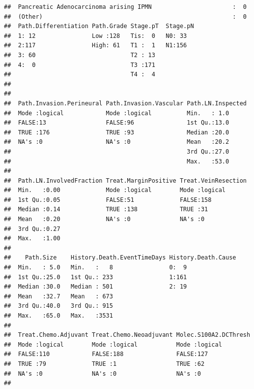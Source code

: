 \documentclass{article}\usepackage[]{graphicx}\usepackage[]{color}
\makeatletter
\newenvironment{kframe}{%
 \def\at@end@of@kframe{}%
 \ifinner\ifhmode%
  \def\at@end@of@kframe{\end{minipage}}%
  \begin{minipage}{\columnwidth}%
 \fi\fi%
 \def\FrameCommand##1{\hskip\@totalleftmargin \hskip-\fboxsep
 \colorbox{shadecolor}{##1}\hskip-\fboxsep
     \hskip-\linewidth \hskip-\@totalleftmargin \hskip\columnwidth}%
 \MakeFramed {\advance\hsize-\width
   \@totalleftmargin\z@ \linewidth\hsize
   \@setminipage}}%
 {\par\unskip\endMakeFramed%
 \at@end@of@kframe}
\newenvironment{knitrout}{}{} %
\makeatother
\begin{document}
\begin{knitrout}
\begin{kframe}
\begin{verbatim}
##  Pancreatic Adenocarcinoma arising IPMN                       :  0  
##  (Other)                                                      :  0  
##  Path.Differentiation Path.Grade Stage.pT  Stage.pN
##  1: 12                Low :128   Tis:  0   N0: 33  
##  2:117                High: 61   T1 :  1   N1:156  
##  3: 60                           T2 : 13           
##  4:  0                           T3 :171           
##                                  T4 :  4           
##                                                    
##                                                    
##  Path.Invasion.Perineural Path.Invasion.Vascular Path.LN.Inspected
##  Mode :logical            Mode :logical          Min.   : 1.0     
##  FALSE:13                 FALSE:96               1st Qu.:13.0     
##  TRUE :176                TRUE :93               Median :20.0     
##  NA's :0                  NA's :0                Mean   :20.2     
##                                                  3rd Qu.:27.0     
##                                                  Max.   :53.0     
##                                                                   
##  Path.LN.InvolvedFraction Treat.MarginPositive Treat.VeinResection
##  Min.   :0.00             Mode :logical        Mode :logical      
##  1st Qu.:0.05             FALSE:51             FALSE:158          
##  Median :0.14             TRUE :138            TRUE :31           
##  Mean   :0.20             NA's :0              NA's :0            
##  3rd Qu.:0.27                                                     
##  Max.   :1.00                                                     
##                                                                   
##    Path.Size    History.Death.EventTimeDays History.Death.Cause
##  Min.   : 5.0   Min.   :   8                0:  9              
##  1st Qu.:25.0   1st Qu.: 233                1:161              
##  Median :30.0   Median : 501                2: 19              
##  Mean   :32.7   Mean   : 673                                   
##  3rd Qu.:40.0   3rd Qu.: 915                                   
##  Max.   :65.0   Max.   :3531                                   
##                                                                
##  Treat.Chemo.Adjuvant Treat.Chemo.Neoadjuvant Molec.S100A2.DCThresh
##  Mode :logical        Mode :logical           Mode :logical        
##  FALSE:110            FALSE:188               FALSE:127            
##  TRUE :79             TRUE :1                 TRUE :62             
##  NA's :0              NA's :0                 NA's :0              
##                                                                    

\end{verbatim}
\end{kframe}
\end{knitrout}
\end{document}
